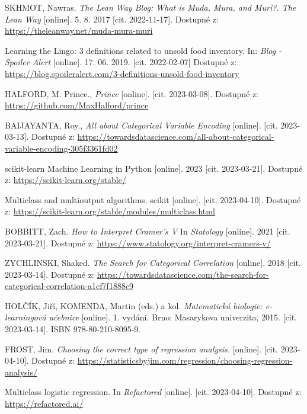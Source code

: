 \begin{thebibliography}{1}
SKHMOT, Nawras. \textit{The Lean Way Blog: What is Muda, Mura, and Muri?. The Lean Way} [online]. 5. 8. 2017 [cit. 2022-11-17]. Dostupné z:
 \url{https://theleanway.net/muda-mura-muri}

Learning the Lingo: 3 definitions related to unsold food inventory. In: \textit{Blog - Spoiler Alert} [online]. 17. 06. 2019. [cit. 2022-02-07] Dostupné z: \url{https://blog.spoileralert.com/3-definitions-unsold-food-inventory}

HALFORD, M. Prince., \textit{Prince} [online]. [cit. 2023-03-08]. Dostupné z: \url{https://github.com/MaxHalford/prince}

BAIJAYANTA, Roy., \textit{All about Categorical Variable Encoding } [online]. [cit. 2023-03-13]. Dostupné z: \url{https://towardsdatascience.com/all-about-categorical-variable-encoding-305f3361fd02}

scikit-learn Machine Learning in Python [online]. 2023 [cit. 2023-03-21]. Dostupné z: \url{https://scikit-learn.org/stable/}

Multiclass and multioutput algorithms. scikit [online]. [cit. 2023-04-10]. Dostupné z: \url{https://scikit-learn.org/stable/modules/multiclass.html} 

BOBBITT, Zach. \textit{How to Interpret Cramer's V} In \textit{Statology} [online]. 2021 [cit. 2023-03-21]. Dostupné z: \url{https://www.statology.org/interpret-cramers-v/}

ZYCHLINSKI, Shaked. \textit{The Search for Categorical Correlation} [online]. 2018 [cit. 2023-03-14]. Dostupné z: \url{https://towardsdatascience.com/the-search-for-categorical-correlation-a1cf7f1888c9}

HOLČÍK, Jiří, KOMENDA, Martin (eds.) a kol. \textit{Matematická biologie: e-learningová učebnice} [online]. 
1. vydání. Brno: Masarykova univerzita, 2015. [cit. 2023-03-14]. ISBN 978-80-210-8095-9.

FROST, Jim. \textit{Choosing the correct type of regression analysis.} [online]. [cit. 2023-04-10]. Dostupné z: \url{https://statisticsbyjim.com/regression/choosing-regression-analysis/}

Multiclass logistic regression. In \textit{Refactored} [online]. [cit. 2023-04-10]. Dostupné z: \url{https://refactored.ai/}


\end{thebibliography}
